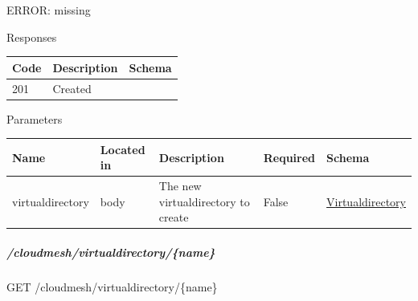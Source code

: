 \documentclass[9pt,]{article}
\let\oldsubparagraph\subparagraph
\renewcommand{\subparagraph}[1]{\oldsubparagraph{#1}\mbox{}}
\begin{document}
ERROR: missing

Responses

\begin{longtable}[]{@{}lll@{}}
\toprule
Code & Description & Schema\tabularnewline
\midrule
\endhead
201 & Created &\tabularnewline
\bottomrule
\end{longtable}

Parameters

\begin{longtable}[]{@{}lllll@{}}
\toprule
\begin{minipage}[b]{0.14\columnwidth}\raggedright
Name\strut
\end{minipage} & \begin{minipage}[b]{0.07\columnwidth}\raggedright
Located in\strut
\end{minipage} & \begin{minipage}[b]{0.27\columnwidth}\raggedright
Description\strut
\end{minipage} & \begin{minipage}[b]{0.08\columnwidth}\raggedright
Required\strut
\end{minipage} & \begin{minipage}[b]{0.29\columnwidth}\raggedright
Schema\strut
\end{minipage}\tabularnewline
\midrule
\endhead
\begin{minipage}[t]{0.14\columnwidth}\raggedright
virtualdirectory\strut
\end{minipage} & \begin{minipage}[t]{0.07\columnwidth}\raggedright
body\strut
\end{minipage} & \begin{minipage}[t]{0.27\columnwidth}\raggedright
The new virtualdirectory to create\strut
\end{minipage} & \begin{minipage}[t]{0.08\columnwidth}\raggedright
False\strut
\end{minipage} & \begin{minipage}[t]{0.29\columnwidth}\raggedright
\protect\hyperlink{virtualdirectory}{Virtualdirectory}\strut
\end{minipage}\tabularnewline
\bottomrule
\end{longtable}

\hypertarget{cloudmeshvirtualdirectoryname}{%
\subparagraph{/cloudmesh/virtualdirectory/\{name\}}\label{cloudmeshvirtualdirectoryname}}

GET /cloudmesh/virtualdirectory/\{name\}
\end{document}
